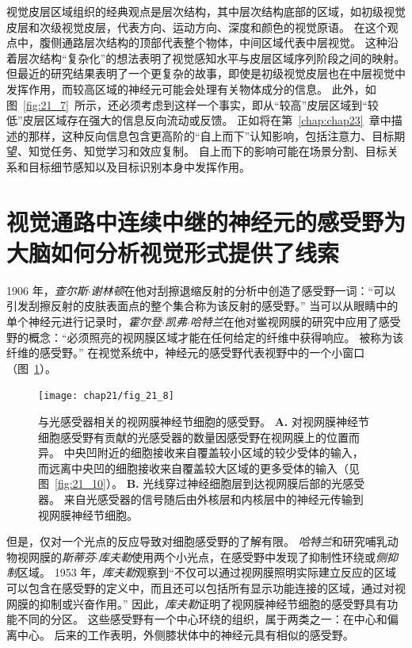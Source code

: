 视觉皮层区域组织的经典观点是层次结构，其中层次结构底部的区域，如初级视觉皮层和次级视觉皮层，代表方向、运动方向、深度和颜色的视觉原语。
在这个观点中，腹侧通路层次结构的顶部代表整个物体，中间区域代表中层视觉。
这种沿着层次结构“复杂化”的想法表明了视觉感知水平与皮层区域序列阶段之间的映射。
但最近的研究结果表明了一个更复杂的故事，即使是初级视觉皮层也在中层视觉中发挥作用，而较高区域的神经元可能会处理有关物体成分的信息。
此外，如图~\ref{fig:21_7}~所示，还必须考虑到这样一个事实，即从“较高”皮层区域到“较低”皮层区域存在强大的信息反向流动或反馈。
正如将在第~\ref{chap:chap23}~章中描述的那样，这种反向信息包含更高阶的“自上而下”认知影响，包括注意力、目标期望、知觉任务、知觉学习和效应复制。
自上而下的影响可能在场景分割、目标关系和目标细节感知以及目标识别本身中发挥作用。



\section{视觉通路中连续中继的神经元的感受野为大脑如何分析视觉形式提供了线索}

1906 年，\textit{查尔斯$\cdot$谢林顿}在他对刮擦退缩反射的分析中创造了感受野一词：“可以引发刮擦反射的皮肤表面点的整个集合称为该反射的感受野。” 
当可以从眼睛中的单个神经元进行记录时，\textit{霍尔登$\cdot$凯弗$\cdot$哈特兰}在他对鲎视网膜的研究中应用了感受野的概念：“必须照亮的视网膜区域才能在任何给定的纤维中获得响应。
被称为该纤维的感受野。” 
在视觉系统中，神经元的感受野代表视野中的一个小窗口（图~\ref{fig:21_8}）。


\begin{figure}[htbp]
	\centering
	\texttt{[image: chap21/fig\_21\_8]}
	\caption{与光感受器相关的视网膜神经节细胞的感受野。
		\textbf{A.} 对视网膜神经节细胞感受野有贡献的光感受器的数量因感受野在视网膜上的位置而异。
		中央凹附近的细胞接收来自覆盖较小区域的较少受体的输入，而远离中央凹的细胞接收来自覆盖较大区域的更多受体的输入（见图~\ref{fig:21_10}）。
		\textbf{B.} 光线穿过神经细胞层到达视网膜后部的光感受器。
		来自光感受器的信号随后由外核层和内核层中的神经元传输到视网膜神经节细胞。}
	\label{fig:21_8}
\end{figure}


但是，仅对一个光点的反应导致对细胞感受野的了解有限。
\textit{哈特兰}和研究哺乳动物视网膜的\textit{斯蒂芬$\cdot$库夫勒}使用两个小光点，在感受野中发现了抑制性环绕或\textit{侧抑制}区域。
1953 年，\textit{库夫勒}观察到“不仅可以通过视网膜照明实际建立反应的区域可以包含在感受野的定义中，而且还可以包括所有显示功能连接的区域，通过对视网膜的抑制或兴奋作用。” 
因此，\textit{库夫勒}证明了视网膜神经节细胞的感受野具有功能不同的分区。
这些感受野有一个中心环绕的组织，属于两类之一：在中心和偏离中心。
后来的工作表明，外侧膝状体中的神经元具有相似的感受野。


